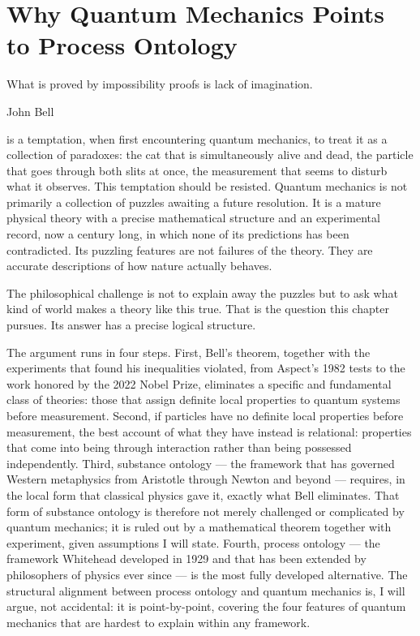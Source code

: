\chapter{Why Quantum Mechanics Points to Process Ontology}
\label{ch:qm-requires-process}

\epigraph{What is proved by impossibility proofs is lack of imagination.}{John Bell}

 is a temptation, when first encountering quantum mechanics, to treat it as
a collection of paradoxes: the cat that is simultaneously alive and dead, the
particle that goes through both slits at once, the measurement that seems to
disturb what it observes.
This temptation should be resisted.
Quantum mechanics is not primarily a collection of puzzles awaiting a future
resolution.
It is a mature physical theory with a precise mathematical structure and an
experimental record, now a century long, in which none of its predictions has
been contradicted.
Its puzzling features are not failures of the theory.
They are accurate descriptions of how nature actually behaves.

The philosophical challenge is not to explain away the puzzles but to ask what
kind of world makes a theory like this true.
That is the question this chapter pursues.
Its answer has a precise logical structure.

The argument runs in four steps.
First, Bell's theorem, together with the experiments that found his inequalities
violated, from Aspect's 1982 tests to the work honored by the 2022 Nobel Prize,
eliminates a specific and fundamental class of theories:
those that assign definite local properties to quantum systems before measurement.
Second, if particles have no definite local properties before measurement, the
best account of what they have instead is relational: properties that come into
being through interaction rather than being possessed independently.
Third, substance ontology --- the framework that has governed Western metaphysics
from Aristotle through Newton and beyond --- requires, in the local form that
classical physics gave it, exactly what Bell eliminates.
That form of substance ontology is therefore not merely challenged or complicated
by quantum mechanics; it is ruled out by a mathematical theorem together with
experiment, given assumptions I will state.
Fourth, process ontology --- the framework Whitehead developed in 1929 and that
has been extended by philosophers of physics ever since --- is the most fully
developed alternative.
The structural alignment between process ontology and quantum mechanics is, I
will argue, not accidental: it is point-by-point, covering the four features of
quantum mechanics that are hardest to explain within any framework.

